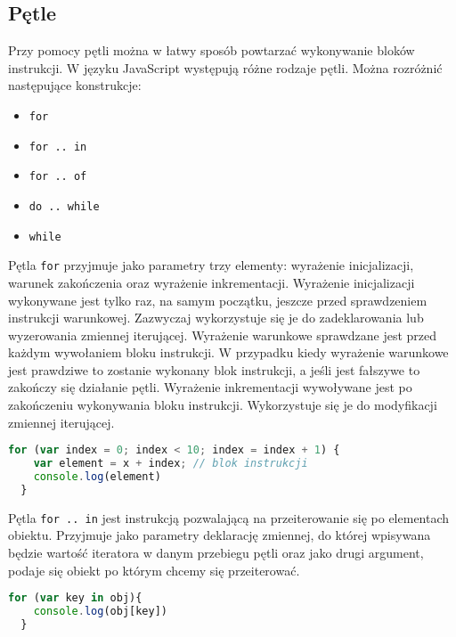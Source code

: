 \subsection{Pętle}
Przy pomocy pętli można w łatwy sposób powtarzać wykonywanie bloków instrukcji. W języku JavaScript występują różne rodzaje pętli. Można rozróżnić następujące konstrukcje:
\begin{itemize}
  \item \texttt{for}
  \item \texttt{for .. in}
  \item \texttt{for .. of}
  \item \texttt{do .. while}
  \item \texttt{while}
\end{itemize}

\par Pętla \texttt{for} przyjmuje jako parametry trzy elementy: wyrażenie inicjalizacji, warunek zakończenia oraz wyrażenie inkrementacji. Wyrażenie inicjalizacji wykonywane jest tylko raz, na samym początku, jeszcze przed sprawdzeniem instrukcji warunkowej. Zazwyczaj wykorzystuje się je do zadeklarowania lub wyzerowania zmiennej iterującej. Wyrażenie warunkowe sprawdzane jest przed każdym wywołaniem bloku instrukcji. W przypadku kiedy wyrażenie warunkowe jest prawdziwe to zostanie wykonany blok instrukcji, a jeśli jest fałszywe to zakończy się działanie pętli. Wyrażenie inkrementacji wywoływane jest po zakończeniu wykonywania bloku instrukcji. Wykorzystuje się je do modyfikacji zmiennej iterującej.

\begin{lstlisting}[language=JavaScript, caption=Przykład użycia instrukcji \texttt{for}, label=alg:instrukcjaFor1]
  for (var index = 0; index < 10; index = index + 1) {
    var element = x + index; // blok instrukcji
    console.log(element)
  }
\end{lstlisting}

\par Pętla \texttt{for .. in} jest instrukcją pozwalającą na przeiterowanie się po elementach obiektu. Przyjmuje jako parametry deklarację zmiennej, do której wpisywana będzie wartość iteratora w danym przebiegu pętli oraz jako drugi argument, podaje się obiekt po którym chcemy się przeiterować. 

\begin{lstlisting}[language=JavaScript, caption=Przykład użycia instrukcji \texttt{for .. in}, label=alg:instrukcjaFor2]
  for (var key in obj){
    console.log(obj[key])
  }
\end{lstlisting}

